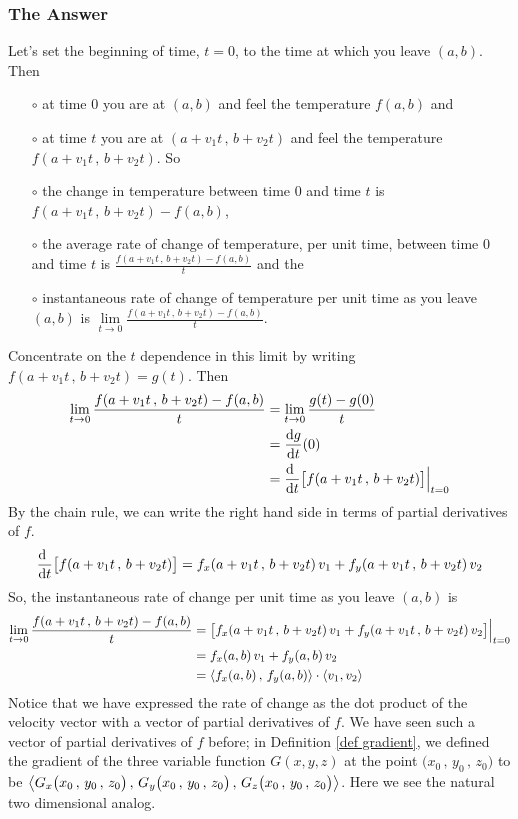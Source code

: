 \subsubsection{The Answer}
Let's set the beginning of time, $t=0$, to the time at which you leave
$(a,b)$. Then 
\begin{itemize}\itemsep1pt \parskip0pt 
\item[$\circ$] 
at time $0$ you are at $(a, b)$ and feel the 
temperature $f(a, b)$ and
\item[$\circ$] 
at time $t$ you are at $(a+v_1t\,,\, b+v_2t)$ and feel the 
temperature $f(a+v_1t\,,\, b+v_2t)$.  So
\item[$\circ$] 
the change in temperature between time $0$ and time $t$ is 
$f(a+v_1t\,,\, b+v_2t)-f(a,b)$, 
\item[$\circ$] 
the average rate of change of temperature, per unit time, between
time $0$ and time $t$ is $\frac{f(a+v_1t\,,\, b+v_2t)-f(a,b)}{t}$ and the
\item[$\circ$] 
instantaneous rate of change of temperature per unit time as you leave
$(a,b)$ is
$
\lim\limits_{t\rightarrow 0}\frac{f(a+v_1t\,,\, b+v_2t)-f(a,b)}{t}
$.
\end{itemize}
Concentrate on the $t$ dependence in this limit by
writing $f(a+v_1t\,,\, b+v_2t)=g(t)$.  Then
\begin{align*}
\lim_{t\rightarrow 0}\frac{f(a+v_1t\,,\, b+v_2t)-f(a,b)}{t}
&=\lim_{t\rightarrow 0}\frac{g(t)-g(0)}{t} \\
&=\diff{g}{t}(0) \\
&=\diff{\hfill}{t}\big[f(a+v_1t\,,\, b+v_2t)\big]\Big|_{t=0}
\end{align*}
By the chain rule, we can write the right hand side in terms of 
partial derivatives of $f$.
\begin{equation*}
\diff{\hfill}{t}\big[f(a+v_1t\,,\, b+v_2t)\big]
  =f_x(a+v_1t\,,\, b+v_2t)\,v_1 + f_y(a+v_1t\,,\, b+v_2t)\,v_2
\end{equation*}
So, the instantaneous rate of change per unit time as you leave $(a,b)$ is
\begin{align*}
\lim_{t\rightarrow 0}\frac{f(a+v_1t\,,\, b+v_2t)-f(a,b)}{t}
&=\big[f_x(a+v_1t\,,\, b+v_2t)\,v_1 + f_y(a+v_1t\,,\, b+v_2t)\,v_2
                           \big]\Big|_{t=0} \\
&=f_x(a,b)\,v_1+f_y(a,b)\,v_2\\
&=\left< f_x(a,b)\,,\,f_y(a,b)\right> \cdot\left< v_1,v_2\right> 
\end{align*} 
Notice that we have expressed the rate of change as the dot product
of the velocity vector with a vector of partial derivatives of $f$.
We have seen such a vector of partial derivatives of $f$ before;
in Definition \ref{def gradient}, we defined the
gradient of the three variable function $G(x,y,z)$ at the point 
$\big( x_0\,,\,y_0\,,\,z_0\big)$ to be
$
\left< G_x\big( x_0\,,\,y_0\,,\,z_0\big)\,,\,
     G_y\big( x_0\,,\,y_0\,,\,z_0\big)\,,\,
     G_z\big( x_0\,,\,y_0\,,\,z_0\big)\right>
$.
Here we see the natural two dimensional analog.

